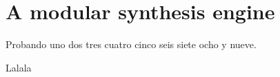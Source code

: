 
\chapter{A modular synthesis engine}

\epigraph{Probando uno dos tres cuatro cinco seis siete ocho y
  nueve.}{Lalala}

